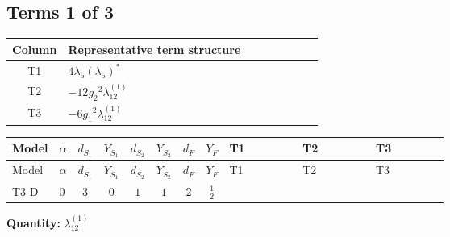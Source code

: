 \documentclass[8pt]{article}
\begin{document}
\begin{landscape}
\subsection*{Terms 1 of 3}
\begin{center}
\begin{tabular}{@{}c >{\raggedright\arraybackslash}p{0.82\linewidth}@{}}
\toprule
Column & Representative term structure \\
\midrule
T1 & \(\displaystyle 4 {\lambda_5} \left({\lambda_5}\right)^{*}\) \\
\midrule
T2 & \(\displaystyle -12 {g_2}^2 {\lambda_{12}^{(1)}}\) \\
\midrule
T3 & \(\displaystyle -6 {g_1}^2 {\lambda_{12}^{(1)}}\) \\
\midrule
\bottomrule
\end{tabular}
\end{center}
\smallskip
\tiny
\begin{longtable}{@{}llcccccc >{\raggedright\arraybackslash}p{0.21\linewidth} >{\raggedright\arraybackslash}p{0.21\linewidth} >{\raggedright\arraybackslash}p{0.21\linewidth}@{}}
\toprule
Model & $\alpha$ & $d_{S_1}$ & $Y_{S_1}$ & $d_{S_2}$ & $Y_{S_2}$ & $d_F$ & $Y_F$ & T1 & T2 & T3 \\
\midrule
\endfirsthead
\toprule
Model & $\alpha$ & $d_{S_1}$ & $Y_{S_1}$ & $d_{S_2}$ & $Y_{S_2}$ & $d_F$ & $Y_F$ & T1 & T2 & T3 \\
\midrule
\endhead
T3-D & $0$ & $3$ & $0$ & $1$ & $1$ & $2$ & $\frac{1}{2}$ & \scriptsize\adjustbox{max width=\linewidth}{$\begin{gathered} 4 {\lambda_5} \left({\lambda_5}\right)^{*}\end{gathered}$} & \scriptsize\adjustbox{max width=\linewidth}{$\begin{gathered} -12 {g_2}^2 {\lambda_{12}^{(1)}}\end{gathered}$} & \scriptsize\adjustbox{max width=\linewidth}{$\begin{gathered} -6 {g_1}^2 {\lambda_{12}^{(1)}}\end{gathered}$} \\
\midrule
\bottomrule
\end{longtable}
\clearpage
\noindent\textbf{Quantity: }$\lambda_{12}^{(1)}$\par\smallskip

\end{landscape}
\end{document}
